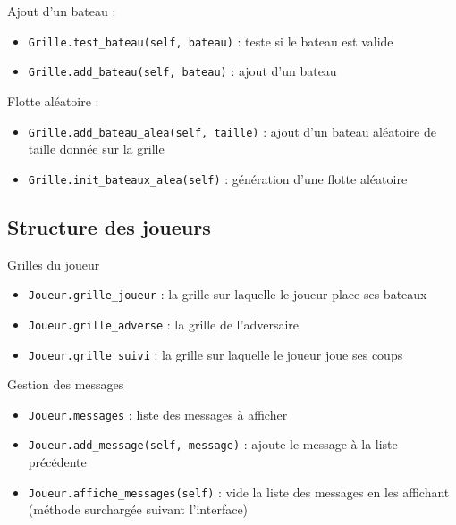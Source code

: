 \begin{frame}
Ajout d'un bateau :
\begin{itemize}
\item \texttt{Grille.test\_bateau(self, bateau)} : teste si le bateau est valide
\item \texttt{Grille.add\_bateau(self, bateau)} : ajout d'un bateau 
\end{itemize}
\end{frame}

\begin{frame}
Flotte aléatoire :
\begin{itemize}
\item \texttt{Grille.add\_bateau\_alea(self, taille)} : ajout d'un bateau aléatoire de taille donnée sur la grille
\item \texttt{Grille.init\_bateaux\_alea(self)} : génération d'une flotte aléatoire
\end{itemize}
\end{frame}

\subsection{Structure des joueurs}
\begin{frame}{Grilles du joueur}
\begin{itemize}
\item \texttt{Joueur.grille\_joueur} : la grille sur laquelle le joueur place ses bateaux
\item \texttt{Joueur.grille\_adverse} : la grille de l'adversaire
\item \texttt{Joueur.grille\_suivi} : la grille sur laquelle le joueur joue ses coups
\end{itemize}

\end{frame}

\begin{frame}{Gestion des messages}
\begin{itemize}
\item \texttt{Joueur.messages} : liste des messages à afficher
\item \texttt{Joueur.add\_message(self, message)} : ajoute le message à la liste précédente
\item \texttt{Joueur.affiche\_messages(self)} : vide la liste des messages en les affichant (méthode surchargée suivant l'interface)
\end{itemize}

\end{frame}

